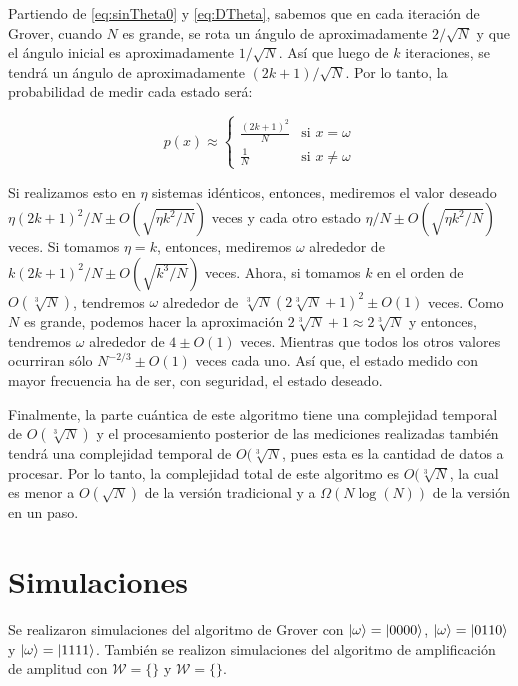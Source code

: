 Partiendo de \ref{eq:sinTheta0} y \ref{eq:DTheta}, sabemos que en cada iteración de Grover, cuando $N$ es grande, se rota un ángulo de aproximadamente $2/\sqrt{N}$ y que el ángulo inicial es aproximadamente $1/\sqrt{N}$. Así que luego de $k$ iteraciones, se tendrá un ángulo de aproximadamente $(2k + 1)/\sqrt{N}$. Por lo tanto, la probabilidad de medir cada estado será:

\begin{equation}
    p(x) \approx
    \begin{cases}
        \frac{(2k + 1)^2}{N} & \text{si } x = \omega \\
        \frac{1}{N} & \text{si } x \neq \omega
    \end{cases}
\end{equation}

Si realizamos esto en $\eta$ sistemas idénticos, entonces, mediremos el valor deseado $\eta (2k + 1)^2 / N \pm O(\sqrt{\eta k^2/N})$ veces y cada otro estado $\eta / N \pm O(\sqrt{\eta k^2/N})$ veces. Si tomamos $\eta = k$, entonces, mediremos $\omega$ alrededor de $k (2k + 1)^2 / N \pm O(\sqrt{k^3/N})$ veces. Ahora, si tomamos $k$ en el orden de $O(\sqrt[3]{N})$, tendremos $\omega$ alrededor de $\sqrt[3]{N} ( 2 \sqrt[3]{N} + 1)^2 \pm O(1)$ veces. Como $N$ es grande, podemos hacer la aproximación $2 \sqrt[3]{N} + 1 \approx 2 \sqrt[3]{N}$ y entonces, tendremos $\omega$ alrededor de $4 \pm O(1)$ veces. Mientras que todos los otros valores ocurriran sólo $N^{-2/3} \pm O(1)$ veces cada uno. Así que, el estado medido con mayor frecuencia ha de ser, con seguridad, el estado deseado.

Finalmente, la parte cuántica de este algoritmo tiene una complejidad temporal de $O(\sqrt[3]{N})$ y el procesamiento posterior de las mediciones realizadas también tendrá una complejidad temporal de $O(\sqrt[3]{N}$, pues esta es la cantidad de datos a procesar. Por lo tanto, la complejidad total de este algoritmo es $O(\sqrt[3]{N}$, la cual es menor a $O(\sqrt{N})$ de la versión tradicional y a $\Omega(N \log(N))$ de la versión en un paso.

\section{Simulaciones}

Se realizaron simulaciones del algoritmo de Grover con $\ket{\omega} = \ket{0000}$, $\ket{\omega} = \ket{0110}$ y $\ket{\omega} = \ket{1111}$. También se realizon simulaciones del algoritmo de amplificación de amplitud con $\mathcal{W} = \{ \}$ y $\mathcal{W} = \{ \}$.

